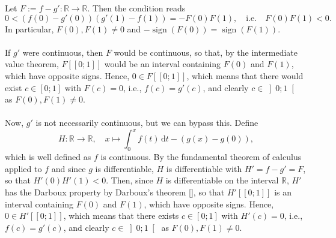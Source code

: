 \begin{solution}
    Let \( F := f-g' \colon \mathbb{R} \to \mathbb{R} \). Then the condition reads
    \[
        0 < \left(f\left(0\right)-g'\left(0\right)\right)\left(g'\left(1\right)-f\left(1\right)\right) = -F\left(0\right)F\left(1\right), \quad \text{i.e.} \quad F\left(0\right)F\left(1\right) < 0.
    \]
    In particular, \( F\left(0\right), F\left(1\right) \neq 0 \) and \( -\operatorname{sign}\left(F\left(0\right)\right) = \operatorname{sign}\left(F\left(1\right)\right) \).
    \\\\
    If \( g' \) were continuous, then \( F \) would be continuous, so that, by the intermediate value theorem, \( F\left[\left[0;1\right]\right] \) would be an interval containing \( F\left(0\right) \) and \( F\left(1\right) \), which have opposite signs. Hence, \( 0 \in F\left[\left[0;1\right]\right] \), which means that there would exist \( c \in \left[0;1\right] \) with \( F\left(c\right) = 0 \), i.e., \( f\left(c\right) = g'\left(c\right) \), and clearly \( c \in \left]0;1\right[ \) as \( F\left(0\right), F\left(1\right) \neq 0 \).
    \\\\
    Now, \( g' \) is not necessarily continuous, but we can bypass this. Define
    \[
        H \colon \mathbb{R} \to \mathbb{R}, \quad x \mapsto \int_0^x f\left(t\right) \, \mathrm{d}t-\left(g\left(x\right)-g\left(0\right)\right),
    \]
    which is well defined as \( f \) is continuous. By the fundamental theorem of calculus applied to \( f \) and since \( g \) is differentiable, \( H \) is differentiable with \( H' = f-g' = F \), so that \( H'\left(0\right)H'\left(1\right) < 0 \). Then, since \( H \) is differentiable on the interval \( \mathbb{R} \), \( H' \) has the Darboux property by Darboux's theorem [], so that \( H'\left[\left[0;1\right]\right] \) is an interval containing \( F\left(0\right) \) and \( F\left(1\right) \), which have opposite signs. Hence, \( 0 \in H'\left[\left[0;1\right]\right] \), which means that there exists \( c \in \left[0;1\right] \) with \( H'\left(c\right) = 0 \), i.e., \( f\left(c\right) = g'\left(c\right) \), and clearly \( c \in \left]0;1\right[ \) as \( F\left(0\right), F\left(1\right) \neq 0 \).
\end{solution}
